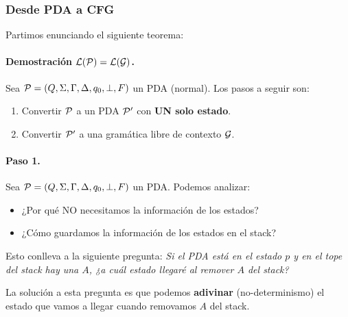 \subsubsection{Desde PDA a CFG}
Partimos enunciando el siguiente teorema:
\paragraph{Demostración $\mathcal{L}(\mathcal{P}) = \mathcal{L}(\mathcal{G})$.} Sea $\mathcal{P}=(Q,\Sigma,\Gamma,\Delta,q_0,\bot,F)$ un PDA (normal). Los pasos a seguir son:
\begin{enumerate}
    \item Convertir $\mathcal{P}$ a un PDA $\mathcal{P}'$ con \textbf{UN solo estado}.
    \item Convertir $\mathcal{P}'$ a una gramática libre de contexto $\mathcal{G}$.
\end{enumerate}

\paragraph{Paso 1.} Sea $\mathcal{P}=(Q,\Sigma,\Gamma,\Delta,q_0,\bot,F)$ un PDA. Podemos analizar:
\begin{itemize}
    \item ¿Por qué NO necesitamos la información de los estados?
    \item ¿Cómo guardamos la información de los estados en el stack?
\end{itemize}

Esto conlleva a la siguiente pregunta: \textit{Si el PDA está en el estado $p$ y en el tope del stack hay una $A$, ¿a cuál estado llegaré al remover $A$ del stack?} \medbreak

La solución a esta pregunta es que podemos \textbf{adivinar} (no-determinismo) el estado que vamos a llegar cuando removamos $A$ del stack. \medbreak

